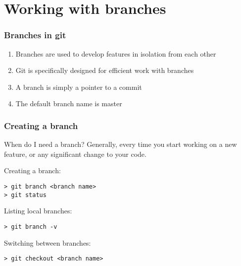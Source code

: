 \section{Working with branches}

\begin{frame}

\frametitle{Branches in git}
	
\begin{enumerate}
	\item Branches are used to develop features in isolation from each other
	\item Git is specifically designed for efficient work with branches
	\item A branch is simply a pointer to a commit
	\item The default branch name is \alert{master}
\end{enumerate}	
		
\end{frame}


\begin{frame}[fragile]
	
\frametitle{Creating a branch}
	
\begin{block}{When do I need a branch?}
Generally, every time you start working on a new feature, or any significant change to your code.
\end{block}
	
Creating a branch:
\begin{verbatim}
> git branch <branch name>
> git status
\end{verbatim}
	
Listing local branches:
\begin{verbatim}
> git branch -v
\end{verbatim}	
	
Switching between branches:
\begin{verbatim}
> git checkout <branch name>
\end{verbatim}
	
	
\end{frame}


